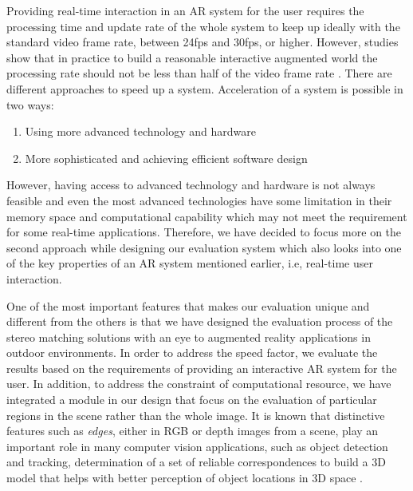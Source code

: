 Providing real-time interaction in an AR system for the user requires the processing time and update rate of the whole system to keep up ideally with the standard video frame rate, 
between 24fps and 
30fps, or higher. 
However, studies show that in practice to build a reasonable interactive augmented world the processing rate should not be less than half of the video frame rate \cite{hertz00}. 
There are different approaches to speed up a system. Acceleration of a system is possible in two ways:
\begin{enumerate}
\item Using more advanced technology and hardware
\item More sophisticated and achieving efficient software design
\end{enumerate}
However, having access to advanced technology and hardware is not always feasible and even the most advanced 
technologies have some limitation in their memory space and computational capability
which may not meet the requirement for some real-time applications. 
Therefore, we have decided to focus more on the second approach while designing our evaluation system which also looks into one of the
key properties of an AR system mentioned earlier, i.e, real-time user interaction.

One of the most important features that makes our evaluation unique and different from the others is that we have 
designed the evaluation process of the stereo matching solutions with an eye to augmented 
reality applications in outdoor environments.
In order to address the speed factor, we evaluate the results based on the requirements of providing an interactive AR system for the user.
In addition, to address the constraint of computational resource, we have integrated a module in our design that 
focus on the evaluation of particular regions in the scene rather than 
the whole image. 
It is known that distinctive features such as {\it edges}, either in RGB or depth images from a scene, 
play an important role in many computer vision applications, such as object detection and 
tracking, determination of a set of reliable correspondences to build a 
3D model that helps with better perception of object locations in 3D space \cite{mart01,sze11}.

